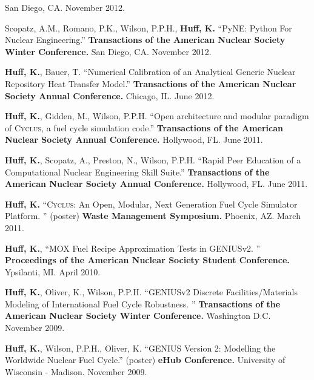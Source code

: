 \documentclass[margin,line]{resume}
\newcommand{\Cyclus}{\textsc{Cyclus}\xspace}%
\begin{document}
\begin{resume}
\begin{bibenum}
        San Diego, CA. November 2012.
      \item Scopatz, A.M., Romano, P.K., Wilson, P.P.H., \textbf{Huff, K.} ``PyNE: Python For Nuclear Engineering.''
         \textbf{Transactions of the American Nuclear Society Winter Conference.}
        San Diego, CA. November 2012.
      \item \textbf{Huff, K.}, Bauer, T. ``Numerical Calibration of an Analytical Generic Nuclear Repository Heat Transfer Model.''
         \textbf{Transactions of the American Nuclear Society Annual Conference.}
        Chicago, IL. June 2012.
      \item \textbf{Huff, K.}, Gidden, M., Wilson, P.P.H. ``Open architecture and modular paradigm of \Cyclus, a fuel cycle simulation code.''
         \textbf{Transactions of the American Nuclear Society Annual Conference.}
        Hollywood, FL. June 2011.
      \item \textbf{Huff, K.}, Scopatz, A., Preston, N., Wilson, P.P.H. ``Rapid Peer Education of a Computational Nuclear Engineering Skill Suite.''
         \textbf{Transactions of the American Nuclear Society Annual Conference.}
        Hollywood, FL. June 2011.
      \item \textbf{Huff, K.} ``\Cyclus: An Open, Modular, Next Generation Fuel Cycle Simulator Platform. ''
        (poster)  \textbf{Waste Management Symposium.} Phoenix, AZ. March
        2011.
      \item \textbf{Huff, K.}, ``MOX Fuel Recipe Approximation Tests in GENIUSv2. ''
         \textbf{Proceedings of the American Nuclear Society Student Conference.}
        Ypsilanti, MI. April 2010.
      \item \textbf{Huff, K.}, Oliver, K., Wilson, P.P.H. ``GENIUSv2 Discrete Facilities/Materials Modeling of International
        Fuel Cycle Robustness. ''
         \textbf{Transactions of the American Nuclear Society Winter Conference.}
        Washington D.C. November 2009.
      \item \textbf{Huff, K.}, Wilson, P.P.H., Oliver, K. ``GENIUS Version 2: Modelling the Worldwide Nuclear Fuel Cycle.''
        (poster)  \textbf{eHub Conference.} University of Wisconsin -
        Madison. November 2009.
    \end{bibenum}


\end{resume}
\end{document}
